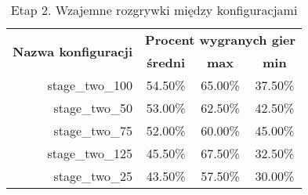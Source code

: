 \begin{longtable}[c]{|r|c|c|c|}
\caption{\label{tab:results/stage_two_all_play_all}Etap 2. Wzajemne rozgrywki między konfiguracjami} \\
\hline

\multirow{2}{*}{\textbf{Nazwa konfiguracji}} & \multicolumn{3}{|c|}{\textbf{Procent wygranych gier}} \\
\cline{2-4}
&\textbf{średni} & \textbf{max} & \textbf{min} \\
\hline
stage\_two\_100 & 54.50\% & 65.00\% & 37.50\% \\
\hline
stage\_two\_50 & 53.00\% & 62.50\% & 42.50\% \\
\hline
stage\_two\_75 & 52.00\% & 60.00\% & 45.00\% \\
\hline
stage\_two\_125 & 45.50\% & 67.50\% & 32.50\% \\
\hline
stage\_two\_25 & 43.50\% & 57.50\% & 30.00\% \\
\hline
\end{longtable}
